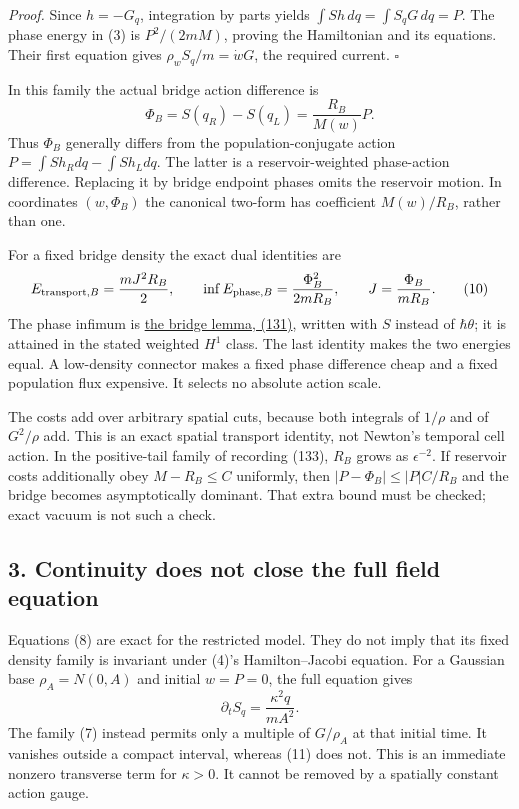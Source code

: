 \documentclass[11pt,a4paper]{article}
\begin{document}
\emph{Proof.} Since \(h=-G_q\), integration by parts yields
\(\int S h\,dq=\int S_qG\,dq=P\). The phase energy in (3) is
\(P^2/(2mM)\), proving the Hamiltonian and its equations. Their first
equation gives \(\rho_wS_q/m=\dot wG\), the required current.
\(\square\)

In this family the actual bridge action difference is
\[\Phi_B=S(q_R)-S(q_L)=\frac{R_B}{M(w)}P.\tag{9}\] Thus \(\Phi_B\)
generally differs from the population-conjugate action
\(P=\int S h_Rdq-\int S h_Ldq\). The latter is a reservoir-weighted
phase-action difference. Replacing it by bridge endpoint phases omits
the reservoir motion. In coordinates \((w,\Phi_B)\) the canonical
two-form has coefficient \(M(w)/R_B\), rather than one.

For a fixed bridge density the exact dual identities are
\[E_{{\rm transport},B}=\frac{mJ^2R_B}{2},\qquad
\inf E_{{\rm phase},B}=\frac{\Phi_B^2}{2mR_B},\qquad
J=\frac{\Phi_B}{mR_B}.\tag{10}\] The phase infimum is
\href{sed-closure-under-recording.md\#local-phase-data-and-unread-energy}{the
bridge lemma, (131)}, written with \(S\) instead of \(\hbar\theta\); it
is attained in the stated weighted \(H^1\) class. The last identity
makes the two energies equal. A low-density connector makes a fixed
phase difference cheap and a fixed population flux expensive. It selects
no absolute action scale.

The costs add over arbitrary spatial cuts, because both integrals of
\(1/\rho\) and of \(G^2/\rho\) add. This is an exact spatial transport
identity, not Newton's temporal cell action. In the positive-tail family
of recording (133), \(R_B\) grows as \(\epsilon^{-2}\). If reservoir
costs additionally obey \(M-R_B\le C\) uniformly, then
\(|P-\Phi_B|\le |P|C/R_B\) and the bridge becomes asymptotically
dominant. That extra bound must be checked; exact vacuum is not such a
check.

\hypertarget{continuity-does-not-close-the-full-field-equation}{%
\subsection{3. Continuity does not close the full field
equation}\label{continuity-does-not-close-the-full-field-equation}}

Equations (8) are exact for the restricted model. They do not imply that
its fixed density family is invariant under (4)'s Hamilton--Jacobi
equation. For a Gaussian base \(\rho_A=N(0,A)\) and initial \(w=P=0\),
the full equation gives
\[\partial_tS_q=\frac{\kappa^2 q}{mA^2}.\tag{11}\] The family (7)
instead permits only a multiple of \(G/\rho_A\) at that initial time. It
vanishes outside a compact interval, whereas (11) does not. This is an
immediate nonzero transverse term for \(\kappa>0\). It cannot be removed
by a spatially constant action gauge.
\end{document}
